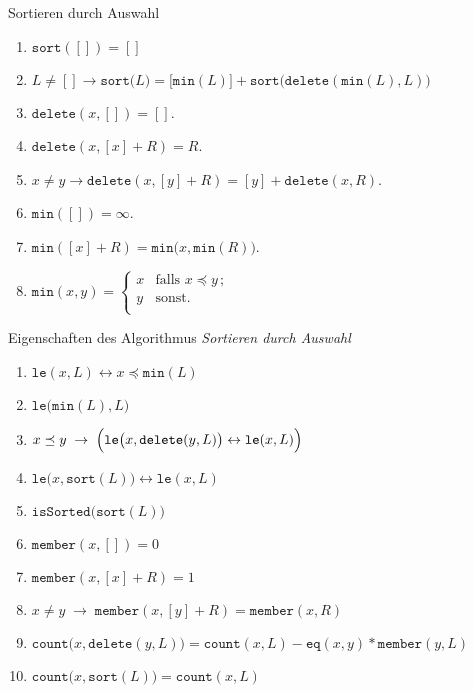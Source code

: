 \documentclass[12pt]{article}
\begin{document}
\begin{center}
{\Large Sortieren durch Auswahl}
\end{center}
\vspace*{0.3cm}
\large
\begin{enumerate}
\item $\mathtt{sort}([]) = []$
\item $L \not= [] \rightarrow \mathtt{sort}\bigl(L\bigr) = \bigl[\texttt{min}(L)\bigr]
      + \mathtt{sort}\bigl(\mathtt{delete}(\texttt{min}(L), L)\bigr)$
\item $\mathtt{delete}(x, []) = []$.
\item $\mathtt{delete}(x, [x] + R) = R$.
\item $x \not = y \rightarrow \mathtt{delete}(x, [y] + R) = [y] + \mathtt{delete}(x,R)$.
\item $\mathtt{min}([]) = \infty$.
\item $\mathtt{min}([x] + R) = \mathtt{min}\bigl(x, \mathtt{min}(R) \bigr)$. 
\item $\mathtt{min}(x,y) = \left\{
      \begin{array}{ll}
        x  & \mbox{falls $x \preceq y\,$;} \\
        y  & \mbox{sonst.} \\
      \end{array}\right.
      $
\end{enumerate}
\vspace*{0.5cm}

\begin{center}
{\Large Eigenschaften des Algorithmus \emph{Sortieren durch Auswahl}}
\end{center}
\vspace*{0.3cm}

\begin{enumerate}
\item $\mathtt{le}(x, L) \leftrightarrow x \preceq \texttt{min}(L)$
\item $\mathtt{le}\bigl(\mathtt{min}(L), L\bigr)$
\item $x \preceq y \;\rightarrow\; \Bigl(\mathtt{le}\bigl(x,\mathtt{delete}(y,L)\bigr) \leftrightarrow \mathtt{le}(x, L)\Bigr)$
\item $\mathtt{le}\bigl(x, \mathtt{sort}(L)\bigr) \leftrightarrow \mathtt{le}(x, L)$
\item $\mathtt{isSorted}\bigl(\mathtt{sort}(L)\bigr)$
\item $\mathtt{member}(x,[]) = 0$
\item $\mathtt{member}(x,[x] + R) = 1$
\item $x \not= y \;\rightarrow\; \mathtt{member}(x,[y] + R) = \mathtt{member}(x,R)$
\item $\mathtt{count}\bigl(x, \mathtt{delete}(y,L)\bigr) = \mathtt{count}(x,L) - \mathtt{eq}(x,y)*\mathtt{member}(y,L)$
\item $\mathtt{count}\bigl(x, \mathtt{sort}(L)\bigr) = \mathtt{count}(x, L)$
\end{enumerate}
\pagebreak
\end{document}
